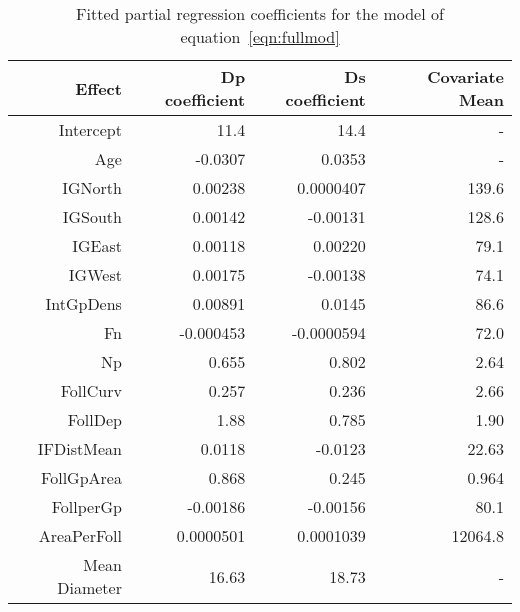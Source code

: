 \begin{table}[ht]
\centering
\caption{Fitted partial regression coefficients for the model of equation~\ref{eqn:fullmod}}
\label{tab:dpdsallcoef}
\begin{tabular}{rrrr}
  \hline
  Effect &  Dp coefficient & Ds coefficient & Covariate Mean \\ 
  \hline
Intercept & 11.4 & 14.4 & -  \\
Age & -0.0307 & 0.0353 & - \\
IGNorth & 0.00238 & 0.0000407 & 139.6 \\
IGSouth & 0.00142 & -0.00131 & 128.6 \\
IGEast & 0.00118 & 0.00220 & 79.1  \\
IGWest & 0.00175 & -0.00138  & 74.1 \\
IntGpDens & 0.00891 & 0.0145 & 86.6 \\
Fn & -0.000453 & -0.0000594  & 72.0 \\
Np & 0.655 & 0.802 & 2.64 \\
FollCurv & 0.257 & 0.236 & 2.66  \\
FollDep & 1.88 & 0.785 & 1.90 \\
IFDistMean & 0.0118 & -0.0123 & 22.63 \\
FollGpArea & 0.868 & 0.245 & 0.964 \\
FollperGp & -0.00186 & -0.00156 & 80.1 \\
AreaPerFoll & 0.0000501 & 0.0001039 & 12064.8\\
   \hline
Mean Diameter & 16.63 & 18.73 & - \\
   \hline
\end{tabular}
\end{table}

